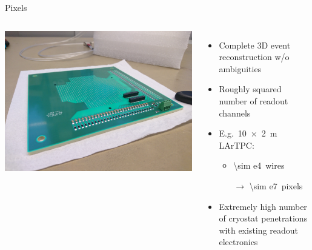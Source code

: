 \documentclass[]{beamer}
\newcommand*{\emphcol}{red}
\newcommand*{\lartpc}{{LArTPC}}
\begin{document}
\begin{frame}{Pixels}
	\begin{columns}[c]
		\centering
		\includegraphics[width=\textwidth]{defence/pcb_new}
		\begin{itemize}
			\item Complete 3D event reconstruction w/o ambiguities
			\item {\color{\emphcol} Roughly squared number of readout channels}
			\item E.g.\ \SI{10 x 2}{\metre} \lartpc{}:
			\begin{itemize}
				\item \num{\sim e4}~wires
				\item[$\rightarrow$] \num{\sim e7}~pixels
			\end{itemize}
			\item Extremely high number of cryostat penetrations with existing readout electronics
		\end{itemize}
	\end{columns}
\end{frame}
\end{document}
